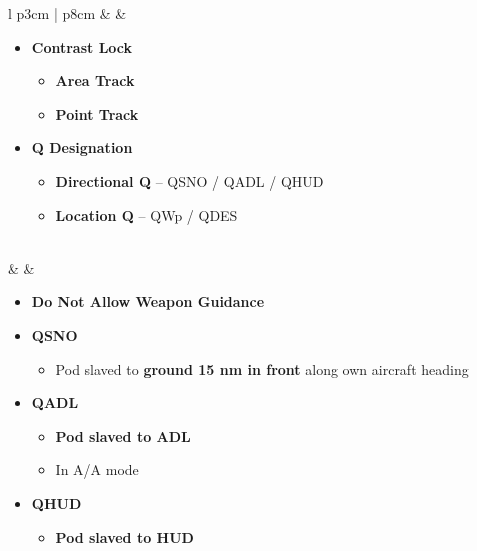 \documentclass[8pt,usenames,dvipsnames,twoside]{article}
\begin{document}
\begin{center}
\begin{longtable}{l p{3cm} | p{8cm}}
				\textbullet &   & 
				\begin{minipage}[t]{\linewidth}
					\vspace{-7pt}
					\begin{itemize}
						\item \textbf{Contrast Lock}
						\begin{itemize}
							\item \textbf{Area Track}
							\item \textbf{Point Track}
						\end{itemize} 
						\item \textbf{Q Designation}
						\begin{itemize}
							\item \textbf{Directional Q} -- QSNO / QADL / QHUD
							\item \textbf{Location Q} -- QWp / QDES
						\end{itemize} 
					\end{itemize}
				\end{minipage} \\
				\midrule
				\textbullet &  & 
				\begin{minipage}[t]{\linewidth}
					\vspace{-7pt}
					\begin{itemize}
						\item \textbf{Do Not Allow Weapon Guidance}
						\item \textbf{QSNO}
						\begin{itemize}
							\item Pod slaved to \textbf{ground 15 nm in front} along own aircraft heading
						\end{itemize}
						\item \textbf{QADL} 
						\begin{itemize}
							\item \textbf{Pod slaved to ADL}
							\item In A/A mode
						\end{itemize}
						\item \textbf{QHUD}
						\begin{itemize}
							\item \textbf{Pod slaved to HUD}

\end{itemize}
\end{itemize}
\end{minipage}
\end{longtable}
\end{center}
\end{document}
